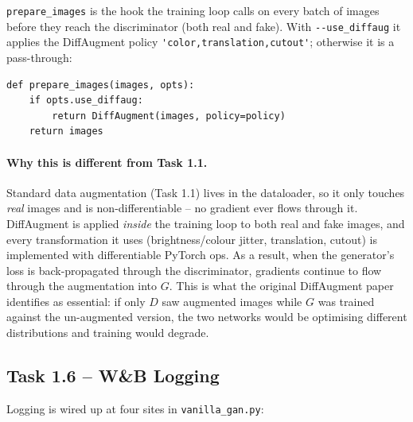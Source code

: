 \documentclass[11pt,a4paper]{article}
\begin{document}
\verb|prepare_images| is the hook the training loop calls on every batch
of images before they reach the discriminator (both real and fake). With
\verb|--use_diffaug| it applies the DiffAugment policy
\verb|'color,translation,cutout'|; otherwise it is a pass-through:

\begin{lstlisting}
def prepare_images(images, opts):
    if opts.use_diffaug:
        return DiffAugment(images, policy=policy)
    return images
\end{lstlisting}

\paragraph{Why this is different from Task 1.1.} Standard data
augmentation (Task 1.1) lives in the dataloader, so it only touches
\emph{real} images and is non-differentiable -- no gradient ever flows
through it. DiffAugment is applied \emph{inside} the training loop to
both real and fake images, and every transformation it uses
(brightness/colour jitter, translation, cutout) is implemented with
differentiable PyTorch ops. As a result, when the generator's loss is
back-propagated through the discriminator, gradients continue to flow
through the augmentation into $G$. This is what the original
DiffAugment paper identifies as essential: if only $D$ saw augmented
images while $G$ was trained against the un-augmented version, the two
networks would be optimising different distributions and training would
degrade.

\subsection*{Task 1.6 -- W\&B Logging}

Logging is wired up at four sites in \verb|vanilla_gan.py|:
\end{document}

